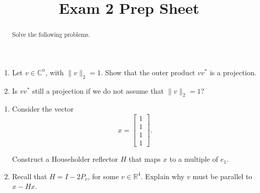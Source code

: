 \documentclass{ximera}
\begin{document}
    \title{Exam 2 Prep Sheet}
    
    \begin{abstract} Solve the following problems.
    \\
    \end{abstract}
    \maketitle


\begin{exercise}
    \begin{enumerate}
        \item Let $v \in \mathbb{C}^n$, with $\|v\|_2 = 1$.  Show that the outer product $vv^*$ is a projection.
        \vfill 
        \item Is $vv^*$ still a projection if we do not assume that $\|v\|_2 = 1$?
        \vfill
    \end{enumerate}
\end{exercise}

\newpage
\begin{exercise}
    \begin{enumerate}
        \item Consider the vector
\[
x=\begin{bmatrix}1\\1\\1\\1\end{bmatrix}.
\]

Construct a Householder reflector $H$ that maps $x$ to a multiple of $e_1$.
\vfill
\item Recall that $H = I - 2P_v$, for some $v \in \mathbb{R}^4$.  Explain why $v$ must be parallel to $x - Hx$.
\end{enumerate}
\end{exercise}
\vfill
\newpage
\end{document}
